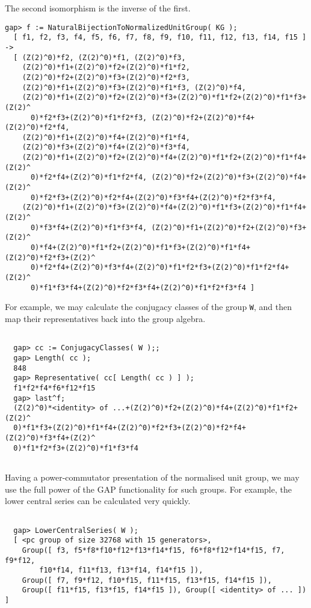 \documentclass[a4paper,11pt]{report}
\begin{document}
{\begin{Verbatim}[fontsize=\small,frame=single,label=Example]
\end{Verbatim}
 \newpage The second isomorphism is the inverse of the first. 
\begin{Verbatim}[fontsize=\small,frame=single,label=Example]
  gap> f := NaturalBijectionToNormalizedUnitGroup( KG );
  [ f1, f2, f3, f4, f5, f6, f7, f8, f9, f10, f11, f12, f13, f14, f15 ] ->
  [ (Z(2)^0)*f2, (Z(2)^0)*f1, (Z(2)^0)*f3,
    (Z(2)^0)*f1+(Z(2)^0)*f2+(Z(2)^0)*f1*f2,
    (Z(2)^0)*f2+(Z(2)^0)*f3+(Z(2)^0)*f2*f3,
    (Z(2)^0)*f1+(Z(2)^0)*f3+(Z(2)^0)*f1*f3, (Z(2)^0)*f4,
    (Z(2)^0)*f1+(Z(2)^0)*f2+(Z(2)^0)*f3+(Z(2)^0)*f1*f2+(Z(2)^0)*f1*f3+(Z(2)^
      0)*f2*f3+(Z(2)^0)*f1*f2*f3, (Z(2)^0)*f2+(Z(2)^0)*f4+(Z(2)^0)*f2*f4,
    (Z(2)^0)*f1+(Z(2)^0)*f4+(Z(2)^0)*f1*f4,
    (Z(2)^0)*f3+(Z(2)^0)*f4+(Z(2)^0)*f3*f4,
    (Z(2)^0)*f1+(Z(2)^0)*f2+(Z(2)^0)*f4+(Z(2)^0)*f1*f2+(Z(2)^0)*f1*f4+(Z(2)^
      0)*f2*f4+(Z(2)^0)*f1*f2*f4, (Z(2)^0)*f2+(Z(2)^0)*f3+(Z(2)^0)*f4+(Z(2)^
      0)*f2*f3+(Z(2)^0)*f2*f4+(Z(2)^0)*f3*f4+(Z(2)^0)*f2*f3*f4,
    (Z(2)^0)*f1+(Z(2)^0)*f3+(Z(2)^0)*f4+(Z(2)^0)*f1*f3+(Z(2)^0)*f1*f4+(Z(2)^
      0)*f3*f4+(Z(2)^0)*f1*f3*f4, (Z(2)^0)*f1+(Z(2)^0)*f2+(Z(2)^0)*f3+(Z(2)^
      0)*f4+(Z(2)^0)*f1*f2+(Z(2)^0)*f1*f3+(Z(2)^0)*f1*f4+(Z(2)^0)*f2*f3+(Z(2)^
      0)*f2*f4+(Z(2)^0)*f3*f4+(Z(2)^0)*f1*f2*f3+(Z(2)^0)*f1*f2*f4+(Z(2)^
      0)*f1*f3*f4+(Z(2)^0)*f2*f3*f4+(Z(2)^0)*f1*f2*f3*f4 ]
\end{Verbatim}
 For example, we may calculate the conjugacy classes of the group \texttt{W}, and then map their representatives back into the group algebra. 
\begin{Verbatim}[fontsize=\small,frame=single,label=Example]
  
  gap> cc := ConjugacyClasses( W );;
  gap> Length( cc );
  848
  gap> Representative( cc[ Length( cc ) ] );
  f1*f2*f4*f6*f12*f15
  gap> last^f;
  (Z(2)^0)*<identity> of ...+(Z(2)^0)*f2+(Z(2)^0)*f4+(Z(2)^0)*f1*f2+(Z(2)^
  0)*f1*f3+(Z(2)^0)*f1*f4+(Z(2)^0)*f2*f3+(Z(2)^0)*f2*f4+(Z(2)^0)*f3*f4+(Z(2)^
  0)*f1*f2*f3+(Z(2)^0)*f1*f3*f4
  
\end{Verbatim}
 Having a power-commutator presentation of the normalised unit group, we may
use the full power of the \textsf{GAP} functionality for such groups. For example, the lower central series can be
calculated very quickly. 
\begin{Verbatim}[fontsize=\small,frame=single,label=Example]
  
  gap> LowerCentralSeries( W );
  [ <pc group of size 32768 with 15 generators>,
    Group([ f3, f5*f8*f10*f12*f13*f14*f15, f6*f8*f12*f14*f15, f7, f9*f12,
        f10*f14, f11*f13, f13*f14, f14*f15 ]),
    Group([ f7, f9*f12, f10*f15, f11*f15, f13*f15, f14*f15 ]),
    Group([ f11*f15, f13*f15, f14*f15 ]), Group([ <identity> of ... ]) ]
  

\end{Verbatim}}
\end{document}
